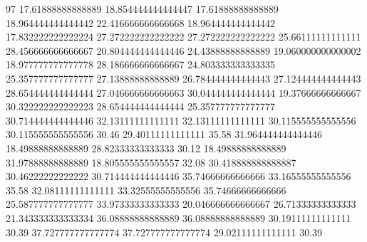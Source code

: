 97 17.61888888888889 18.854444444444447 17.61888888888889 18.964444444444442 22.416666666666668 18.964444444444442 17.832222222222224 27.272222222222222 27.272222222222222 25.66111111111111 28.456666666666667 20.804444444444446 24.43888888888889 19.060000000000002 18.977777777777778 28.186666666666667 24.803333333333335 25.357777777777777 27.13888888888889 26.784444444444443 27.124444444444443 28.654444444444444 27.046666666666663 30.044444444444444 19.37666666666667 30.322222222222223 28.654444444444444 25.357777777777777 30.714444444444446 32.13111111111111 32.13111111111111 30.115555555555556 30.115555555555556 30.46 29.40111111111111 35.58 31.964444444444446 18.49888888888889 28.82333333333333 30.12 18.49888888888889 31.97888888888889 18.805555555555557 32.08 30.418888888888887 30.46222222222222 30.714444444444446 35.74666666666666 33.16555555555556 35.58 32.08111111111111 33.32555555555556 35.74666666666666 25.587777777777777 33.97333333333333 20.046666666666667 26.71333333333333 21.343333333333334 36.08888888888889 36.08888888888889 30.19111111111111 30.39 37.727777777777774 37.727777777777774 29.02111111111111 30.39